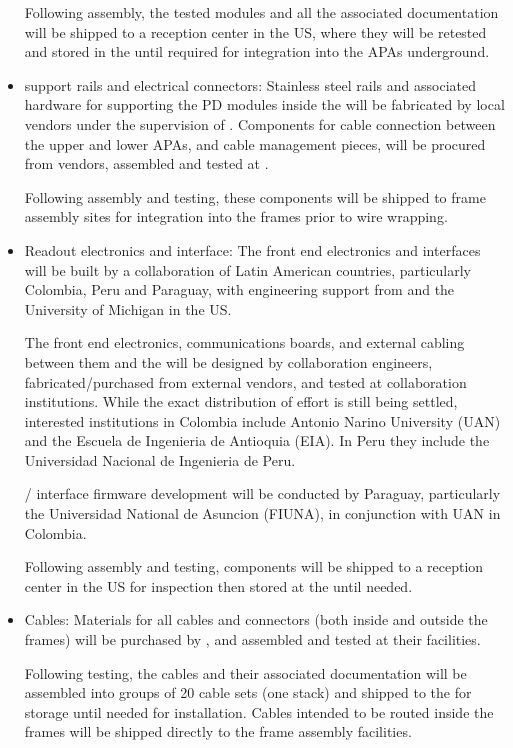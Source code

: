 \begin{itemize}
Following assembly, the tested modules and all the associated  documentation will be shipped to a reception center in the US, where they will be retested and stored in the  until required for integration into the APAs underground.

\item {} support rails and electrical connectors:  Stainless steel rails and associated hardware for supporting the PD modules inside the  will be fabricated by local vendors under the supervision of .  Components for cable connection between the upper and lower APAs, and cable management pieces, will be procured from vendors, assembled and tested at .  

Following assembly and testing, these components will be shipped to  frame assembly sites for integration into the frames prior to wire wrapping.

\item Readout electronics and  interface:  The front end electronics and  interfaces will be built by a collaboration of Latin American countries, particularly Colombia, Peru and Paraguay, with engineering support from  and the University of Michigan in the US. 

The front end electronics, communications boards, and external cabling between them and the  will be designed by collaboration engineers, fabricated/purchased from external vendors, and tested at collaboration institutions.  While the exact distribution of effort is still being settled, interested institutions in Colombia include Antonio Narino University (UAN) and the Escuela de Ingenieria de Antioquia (EIA).  In Peru they include the Universidad Nacional de Ingenieria de Peru.

/ interface firmware development will be conducted by Paraguay, particularly the Universidad National de Asuncion (FIUNA), in conjunction with UAN in Colombia.

Following assembly and testing, components will be shipped to a reception center in the US for inspection then stored at the  until needed.

\item Cables:  Materials for all cables and connectors (both inside and outside the  frames) will be purchased by , and assembled and tested at their facilities.

Following testing, the cables and their associated  documentation will be assembled into groups of 20 cable sets (one  stack) and shipped to the  for storage until needed for installation.  Cables intended to be routed inside the  frames will be shipped directly to the  frame assembly facilities.


\end{itemize}
